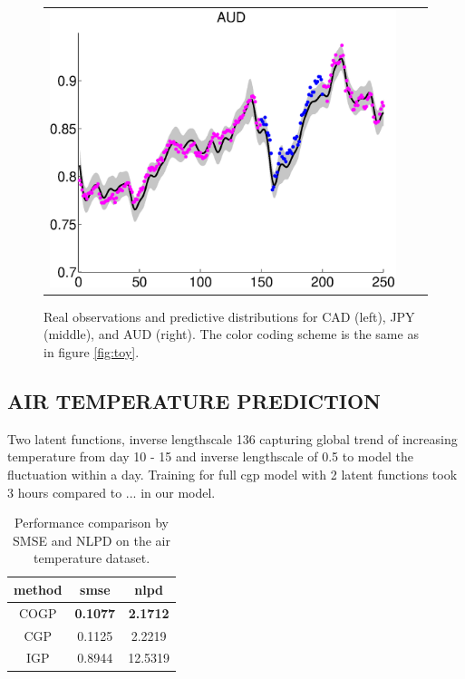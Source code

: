 \begin{figure}
\begin{tabular}{ccc}
\includegraphics[scale=0.3]{figures/fxAUD.eps}
\end{tabular}
\caption{Real observations and predictive distributions for CAD (left), JPY (middle), and AUD (right). The color coding scheme is the same as in figure \ref{fig:toy}.}
\label{fig:fx}
\end{figure}

\subsection{AIR TEMPERATURE PREDICTION}
Two latent functions, inverse lengthscale 136 capturing global trend of increasing temperature from day 10 - 15 and inverse lengthscale of 0.5 to model the fluctuation within a day.
Training for full cgp model with 2 latent functions took 3 hours compared to ... in our model.

\begin{table}[h]
\caption{Performance comparison by SMSE and NLPD on the air temperature dataset.}
\label{tab:fx}
\begin{center}
\begin{tabular}{c|c|c}
method & smse & nlpd \\ \hline
COGP & \textbf{0.1077} & \textbf{2.1712} \\
CGP & 0.1125 & 2.2219 \\
IGP & 0.8944 & 12.5319
\end{tabular}
\end{center}
\end{table}

